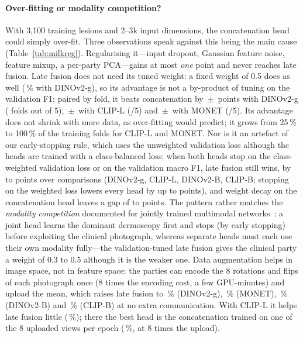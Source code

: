 \paragraph{Over-fitting or modality competition?}
With 3{,}100 training lesions and 2--3k input dimensions, the concatenation head could simply over-fit. Three observations speak against this being the main cause (Table~\ref{tab:milkreg}). Regularising it---input dropout, Gaussian feature noise, feature mixup, a per-party PCA---gains at most \emph{one} point and never reaches late fusion. Late fusion does not need its tuned weight: a fixed weight of 0.5 does as well (\mrGLateHalf\,\% with DINOv2-g), so its advantage is not a by-product of tuning on the validation F1; paired by fold, it beats concatenation by \mrGPairD\,$\pm$\,\mrGPairS{} points with DINOv2-g (\mrGPairW{} folds out of 5), \mrCPairD\,$\pm$\,\mrCPairS{} with CLIP-L (\mrCPairW/5) and \mrMPairD\,$\pm$\,\mrMPairS{} with MONET (\mrMPairW/5). Its advantage does not shrink with more data, as over-fitting would predict; it grows from 25\,\% to 100\,\% of the training folds for CLIP-L and MONET. Nor is it an artefact of our early-stopping rule, which uses the unweighted validation loss although the heads are trained with a class-balanced loss: when both heads stop on the class-weighted validation loss or on the validation macro F1, late fusion still wins, by \mrStopMin{} to \mrStopMax{} points over \mrStopN{} comparisons (DINOv2-g, CLIP-L, DINOv2-B, CLIP-B; stopping on the weighted loss lowers every head by up to \mrWlossDropMax{} points), and weight decay on the concatenation head leaves a gap of \mrWdMin{} to \mrWdMax{} points. The pattern rather matches the \emph{modality competition} documented for jointly trained multimodal networks~\cite{wang2020makes,huang2022modality,peng2022balanced}: a joint head learns the dominant dermoscopy first and stops (by early stopping) before exploiting the clinical photograph, whereas separate heads must each use their own modality fully---the validation-tuned late fusion gives the clinical party a weight of 0.3 to 0.5 although it is the weaker one. Data augmentation helps in image space, not in feature space: the parties can encode the 8 rotations and flips of each photograph once (8 times the encoding cost, a few GPU-minutes) and upload the mean, which raises late fusion to \mrGLateViews\,\% (DINOv2-g), \mrMLateViews\,\% (MONET), \fzViewsB\,\% (DINOv2-B) and \fzViewsCb\,\% (CLIP-B) at no extra communication. With CLIP-L it helps late fusion little (\mrCLateViews\,\%); there the best head is the concatenation trained on one of the 8 uploaded views per epoch (\mrCCatSampled\,\%, at 8 times the upload).


